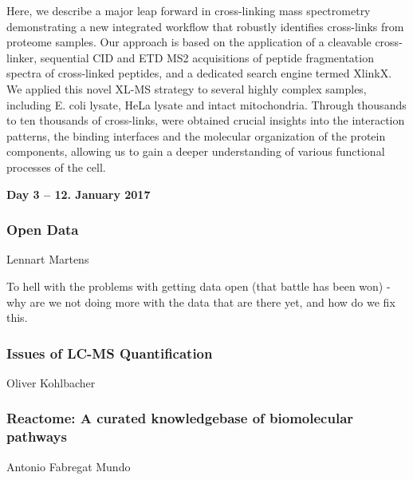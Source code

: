 Here, we describe a major leap forward in cross-linking mass spectrometry
demonstrating a new integrated workflow that robustly identifies cross-links
from proteome samples. Our approach is based on the application of a cleavable
cross-linker, sequential CID and ETD MS2 acquisitions of peptide fragmentation
spectra of cross-linked peptides, and a dedicated search engine termed XlinkX.
We applied this novel XL-MS strategy to several highly complex samples,
including E. coli lysate, HeLa lysate and intact mitochondria. Through thousands
to ten thousands of cross-links, were obtained crucial insights into the
interaction patterns, the binding interfaces and the molecular organization of
the protein components, allowing us to gain a deeper understanding of various
functional processes of the cell.

\vspace{1cm}
\noindent\textbf{Day 3 -- 12. January 2017}

\subsubsection*{\color{eubicRed} Open Data}
{\color{eubicGray}Lennart Martens}

To hell with the problems with getting data open (that battle has been won) -
why are we not doing more with the data that are there yet, and how do we fix
this.


\subsubsection*{\color{eubicRed} Issues of LC-MS Quantification}
{\color{eubicGray}Oliver Kohlbacher}



\subsubsection*{\color{eubicRed} Reactome: A curated knowledgebase of biomolecular pathways}
{\color{eubicGray}Antonio Fabregat Mundo}

